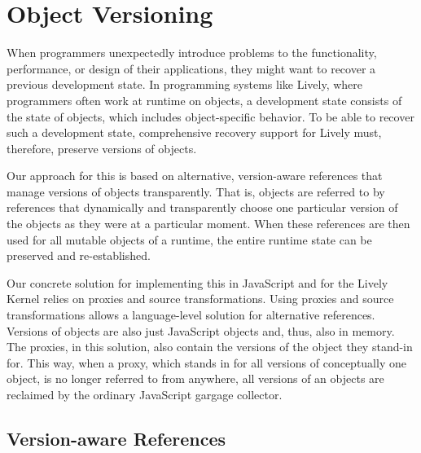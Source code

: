 
\chapter{Object Versioning} \label{chapter:APPROACH}

When programmers unexpectedly introduce problems to the functionality, performance, or design of their applications, they might want to recover a previous development state.
In programming systems like Lively, where programmers often work at runtime on objects, a development state consists of the state of objects, which includes object-specific behavior.
To be able to recover such a development state, comprehensive recovery support for Lively must, therefore, preserve versions of objects.

Our approach for this is based on alternative, version-aware references that manage versions of objects transparently.
That is, objects are referred to by references that dynamically and transparently choose one particular version of the objects as they were at a particular moment.
When these references are then used for all mutable objects of a runtime, the entire runtime state can be preserved and re-established.

Our concrete solution for implementing this in JavaScript and for the Lively Kernel relies on proxies and source transformations.
Using proxies and source transformations allows a language-level solution for alternative references.
Versions of objects are also just JavaScript objects and, thus, also in memory.
The proxies, in this solution, also contain the versions of the object they stand-in for.
This way, when a proxy, which stands in for all versions of conceptually one object, is no longer referred to from anywhere, all versions of an objects are reclaimed by the ordinary JavaScript gargage collector.


\section{Version-aware References} \label{sec:APPROACH:1}

